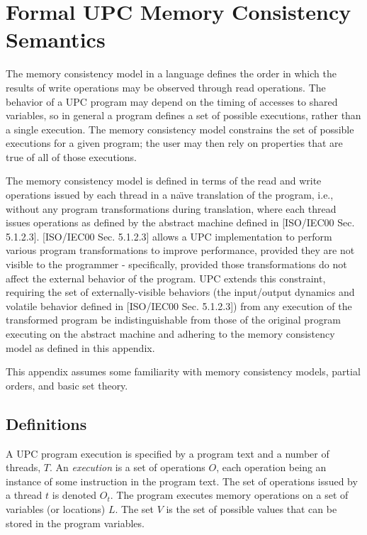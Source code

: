 \pagebreak
\section{Formal UPC Memory Consistency Semantics}
\label{mem-semantics}
\npf The memory consistency model in a language defines the order in 
which the results of write operations may be observed through read operations.  
The behavior of a UPC program may depend on the timing of accesses to shared
variables, so in general a program defines a set of possible executions,
rather than a single execution.  The memory consistency model
constrains the set of possible executions for a given program;
the user may then rely on properties that are true of all
of those executions.  

\np The memory consistency model is defined in terms of the read and 
write operations issued by each thread in a na\"{\i}ve translation
of the program, i.e., without any program transformations during
translation, where each thread issues operations as defined by 
the abstract machine defined in [ISO/IEC00 Sec. 5.1.2.3].  
[ISO/IEC00 Sec. 5.1.2.3] allows a UPC implementation to perform
various program transformations to improve performance, provided they are not visible 
to the programmer - specifically, provided those transformations do not affect 
the external behavior of the program.
UPC extends this constraint, requiring the set of externally-visible behaviors
(the input/output dynamics and volatile behavior defined in [ISO/IEC00 Sec. 5.1.2.3])
from any execution of the transformed program be indistinguishable from those
of the original program executing on the abstract machine 
and adhering to the memory consistency model as defined in this appendix.

\np This appendix assumes some familiarity with memory consistency
models, partial orders, and basic set theory.

\subsection{Definitions}
\npf A UPC program execution is specified by a program text and a
number of threads, $T$.  An \emph{execution} is a set of operations $O$,
each operation being an instance of some instruction in the program 
text.  The set of operations issued by a thread $t$ is denoted 
$O_t$.  The program executes memory operations on a set of 
variables (or locations) $L$.  The set $V$ is the set of 
possible values that can be stored in the program variables.

